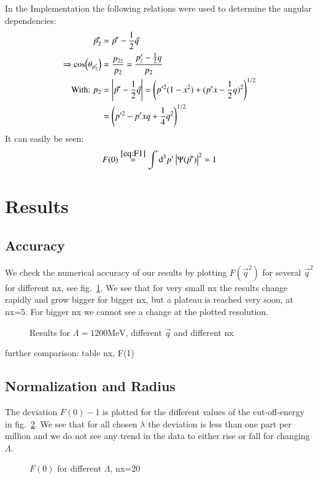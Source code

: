 \documentclass{scrartcl}
\begin{document}
In the Implementation the following relations were used to determine the angular dependencies:
\begin{align}
	\vec{p}_2'&=\vec{p}'-\dfrac{1}{2}\vec{q}\\
	\Rightarrow \cos(\theta_{p_2'})&=\dfrac{p_{2z}}{p_2}=\dfrac{p_{z}'-\frac{1}{2}q}{p_2}\\
	\text{With: } p_2&=\abs{\vec{p}'-\frac{1}{2}\vec{q}}=\left(p'^2(1-x^2)+(p'x-\dfrac{1}{2}q)^2\right)^{1/2}\\
	&=\left(p'^2-p'x q +\dfrac{1}{4}q^2\right)^{1/2}
\end{align}
It can easily be seen:
\begin{equation}
	F(0)\overset{\ref{eq:F1}}{=}\int \dd[3]{p'}\abs{\Psi(\vec{p}')}^2=1
\end{equation}
\section{Results}
\subsection{Accuracy}

We check the numerical accuracy of our results by plotting $F(\vec{q}^2)$ for several $\vec{q}^2$ for different nx, see fig.~\ref{fig:accuracy}. We see that for very small nx the results change rapidly and grow bigger for bigger nx, but a plateau is reached very soon, at nx=5. For bigger nx we cannot see a change at the plotted resolution. 

\begin{figure}[htbp]
	
	\caption{Results for $\Lambda=1200\si{\mega\electronvolt}$, different $\vec{q}$ and different nx}
	\label{fig:accuracy}
\end{figure}

further comparison: table nx, F(1)

\subsection{Normalization and Radius}
The deviation $F(0)-1$ is plotted for the different values of the cut-off-energy in fig.~\ref{fig:fofzero}. We see that for all chosen $\lambda$ the deviation is less than one part per million and we do not see any trend in the data to either rise or fall for changing $\Lambda$.
  
  
\begin{figure}[htbp]
	
	\caption{$F(0)$ for different $\Lambda$, nx=20}
	\label{fig:fofzero}
\end{figure}
\end{document}
